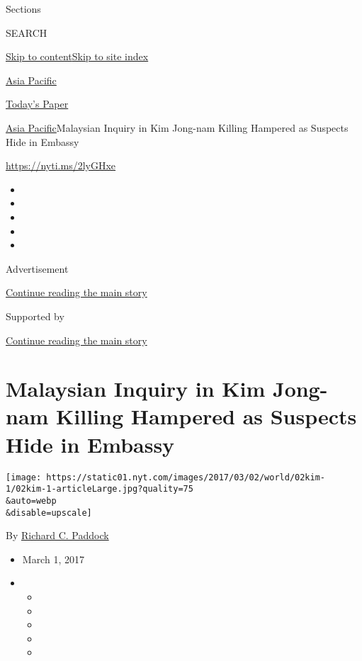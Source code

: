 Sections

SEARCH

\protect\hyperlink{site-content}{Skip to
content}\protect\hyperlink{site-index}{Skip to site index}

\href{https://www.nytimes.com/section/world/asia}{Asia Pacific}

\href{https://myaccount.nytimes.com/auth/login?response_type=cookie\&client_id=vi}{}

\href{https://www.nytimes.com/section/todayspaper}{Today's Paper}

\href{/section/world/asia}{Asia Pacific}\textbar{}Malaysian Inquiry in
Kim Jong-nam Killing Hampered as Suspects Hide in Embassy

\url{https://nyti.ms/2lyGHxe}

\begin{itemize}
\item
\item
\item
\item
\item
\end{itemize}

Advertisement

\protect\hyperlink{after-top}{Continue reading the main story}

Supported by

\protect\hyperlink{after-sponsor}{Continue reading the main story}

\hypertarget{malaysian-inquiry-in-kim-jong-nam-killing-hampered-as-suspects-hide-in-embassy}{%
\section{Malaysian Inquiry in Kim Jong-nam Killing Hampered as Suspects
Hide in
Embassy}\label{malaysian-inquiry-in-kim-jong-nam-killing-hampered-as-suspects-hide-in-embassy}}

\texttt{[image: https://static01.nyt.com/images/2017/03/02/world/02kim-1/02kim-1-articleLarge.jpg?quality=75\\\&auto=webp\\\&disable=upscale]}

By \href{https://www.nytimes.com/by/richard-c-paddock}{Richard C.
Paddock}

\begin{itemize}
\item
  March 1, 2017
\item
  \begin{itemize}
  \item
  \item
  \item
  \item
  \item
  \end{itemize}
\end{itemize}


